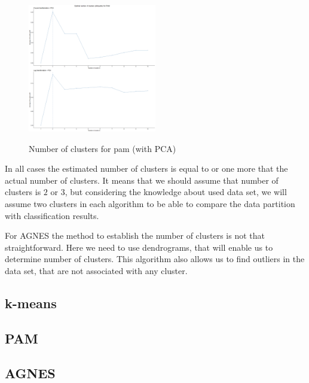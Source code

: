\documentclass{article}
\begin{document}
	\begin{figure}[h]
		\caption{Number of clusters for pam (with PCA)}
		\centering
		\includegraphics[width=0.5\textwidth]{"proj2_plots/pam_clust_num_pca.png"}
		\label{fig::clust_num_pam_pca}
	\end{figure}
	
	In all cases the estimated number of clusters is equal to or one more that the actual number of clusters. It means that we should assume that number of clusters is $2$ or $3$, but considering the knowledge about used data set, we will assume two clusters in each algorithm to be able to compare the data partition with classification results.
	
	For AGNES the method to establish the number of clusters is not that straightforward. Here we need to use dendrograms, that will enable us to determine number of clusters. This algorithm also allows us to find outliers in the data set, that are not associated with any cluster.
	
	
	\subsection{k-means}
	
	\subsection{PAM}
	
	\subsection{AGNES}
	 
\end{document}
